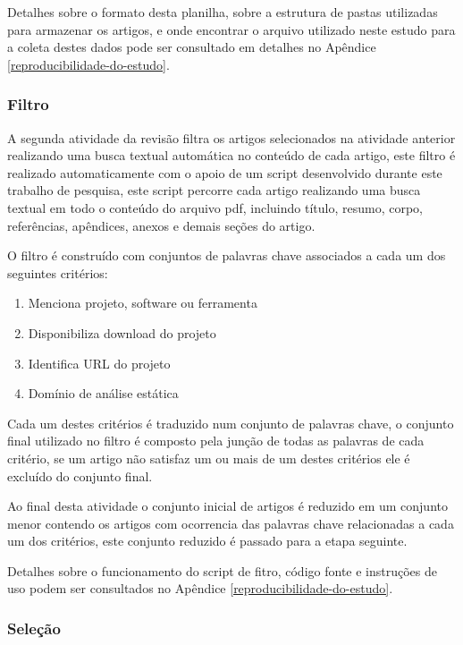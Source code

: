 Detalhes sobre o formato desta planilha, sobre a estrutura de pastas utilizadas
para armazenar os artigos, e onde encontrar o arquivo utilizado neste estudo
para a coleta destes dados pode ser consultado em detalhes no Apêndice
\ref{reproducibilidade-do-estudo}.

\subsubsection{Filtro} \label{estudo1:planejamento:filtro}

A segunda atividade da revisão filtra os artigos selecionados na
atividade anterior realizando uma busca textual automática no conteúdo de cada
artigo, este filtro é realizado automaticamente com o apoio de um script
desenvolvido durante este trabalho de pesquisa, este script percorre cada
artigo realizando uma busca textual em todo o conteúdo do arquivo pdf,
incluindo título, resumo, corpo, referências, apêndices, anexos e demais seções
do artigo.

O filtro é construído com conjuntos de palavras chave associados a cada um dos
seguintes critérios:

\begin{enumerate}
  \item Menciona projeto, software ou ferramenta
  \item Disponibiliza download do projeto
  \item Identifica URL do projeto
  \item Domínio de análise estática
\end{enumerate}

Cada um destes critérios é traduzido num conjunto de palavras chave, o conjunto
final utilizado no filtro é composto pela junção de todas as palavras de cada
critério, se um artigo não satisfaz um ou mais de um destes critérios ele é
excluído do conjunto final.

Ao final desta atividade o conjunto inicial de artigos é reduzido em um
conjunto menor contendo os artigos com ocorrencia das palavras chave
relacionadas a cada um dos critérios, este conjunto reduzido é passado para a
etapa seguinte.

Detalhes sobre o funcionamento do script de fitro, código fonte e instruções
de uso podem ser consultados no Apêndice \ref{reproducibilidade-do-estudo}.

\subsubsection{Seleção}

